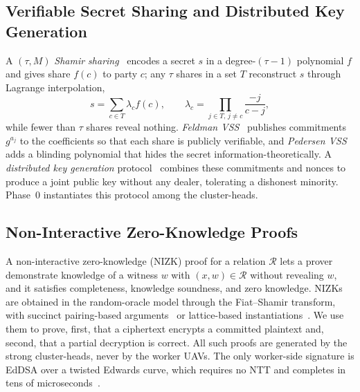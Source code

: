\subsection{Verifiable Secret Sharing and Distributed Key Generation}
\label{subsec:dkg}
A $( \tau, M)$ \emph{Shamir sharing}~\cite{shamir1979} encodes a secret $s$ in a degree-$(\tau-1)$ polynomial $f$ and gives share $f(c)$ to party $c$; any $\tau$ shares in a set $T$ reconstruct $s$ through Lagrange interpolation,
\begin{equation}
  \label{eq:lagrange}
  s=\sum_{c\in T}\lambda_c f(c),\qquad
  \lambda_c=\prod_{j\in T,\,j\neq c}\frac{-j}{c-j},
\end{equation}
while fewer than $\tau$ shares reveal nothing. \emph{Feldman VSS}~\cite{feldman1987} publishes commitments $g^{a_j}$ to the coefficients so that each share is publicly verifiable, and \emph{Pedersen VSS}~\cite{pedersen1991} adds a blinding polynomial that hides the secret information-theoretically. A \emph{distributed key generation} protocol~\cite{gennaro2007dkg} combines these commitments and nonces to produce a joint public key without any dealer, tolerating a dishonest minority. Phase~0 instantiates this protocol among the cluster-heads.

\subsection{Non-Interactive Zero-Knowledge Proofs}
\label{subsec:nizk}
A non-interactive zero-knowledge (NIZK) proof for a relation $\mathcal{R}$ lets a prover demonstrate knowledge of a witness $w$ with $(x,w)\in\mathcal{R}$ without revealing $w$, and it satisfies completeness, knowledge soundness, and zero knowledge. NIZKs are obtained in the random-oracle model through the Fiat--Shamir transform, with succinct pairing-based arguments~\cite{groth2016} or lattice-based instantiations~\cite{grothsahai2008}. We use them to prove, first, that a ciphertext encrypts a committed plaintext and, second, that a partial decryption is correct. All such proofs are generated by the strong cluster-heads, never by the worker UAVs. The only worker-side signature is EdDSA over a twisted Edwards curve, which requires no NTT and completes in tens of microseconds~\cite{rfc8032}.
